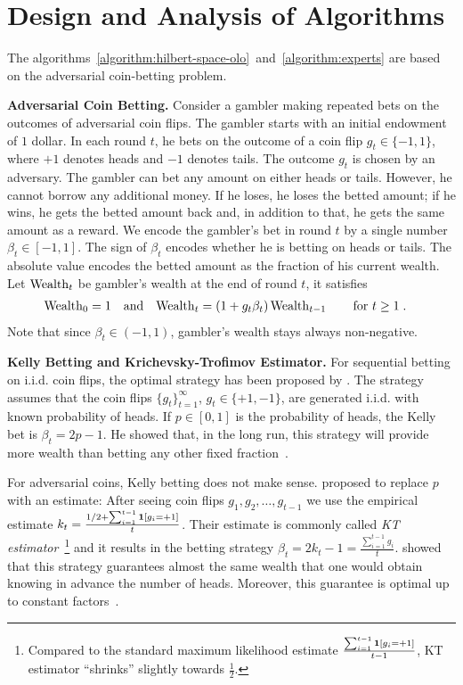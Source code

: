 \section{Design and Analysis of Algorithms}

The algorithms~\ref{algorithm:hilbert-space-olo}~and~\ref{algorithm:experts}
are based on the adversarial coin-betting problem.

\textbf{Adversarial Coin Betting.}
Consider a gambler making
repeated bets on the outcomes of adversarial coin flips. The gambler starts with an
initial endowment of $1$ dollar. In each round $t$, he bets on the outcome of a
coin flip $g_t \in \{-1,1\}$, where $+1$ denotes heads and $-1$ denotes tails.
The outcome $g_t$ is chosen by an adversary.
The gambler can bet any amount on either heads or tails. However, he cannot borrow
any additional money. If he loses, he loses the betted
amount; if he wins, he gets the betted amount back and, in addition to that, he
gets the same amount as a reward.  We encode the gambler's bet in round $t$ by a
single number $\beta_t \in [-1,1]$. The sign of $\beta_t$ encodes whether he is
betting on heads or tails. The absolute value encodes the betted amount as the
fraction of his current wealth.
Let $\operatorname{Wealth}_t$ be gambler's wealth at the end of round $t$, it satisfies
\begin{align}
\label{equation:wealth-recurrence}
\operatorname{Wealth}_0 & = 1 &
& \text{and} &
\operatorname{Wealth}_t & = (1 + g_t \beta_t) \operatorname{Wealth}_{t-1} \qquad \text{for $t \ge 1$} \; .
\end{align}
Note that since $\beta_t \in (-1,1)$, gambler's wealth stays always non-negative.

\textbf{Kelly Betting and Krichevsky-Trofimov Estimator.}
For sequential betting on i.i.d. coin flips, the optimal strategy has been proposed by \citet{Kelly-1956}.
The strategy assumes that the coin flips $\{g_t\}_{t=1}^\infty$, $g_t
\in \{+1,-1\}$, are generated i.i.d. with known probability of heads. If $p \in
[0,1]$ is the probability of heads, the Kelly bet is $\beta_t = 2p - 1$. He
showed that, in the long run, this strategy will provide more wealth than
betting any other fixed fraction~\cite{Kelly-1956}.

For adversarial coins, Kelly betting does not make sense.
\citet{Krichevsky-Trofimov-1981} proposed to replace $p$ with an estimate:
After seeing coin flips
$g_1, g_2, \dots, g_{t-1}$ we use the empirical estimate $k_t = \frac{1/2 +
\sum_{i=1}^{t-1} \mathbf{1}[g_i = +1]}{t}$. Their
estimate is commonly called \emph{KT estimator}~\footnote{Compared to the
standard maximum likelihood estimate $\frac{\sum_{i=1}^{t-1} \mathbf{1}[g_i =
+1]}{t-1}$, KT estimator ``shrinks'' slightly towards $\frac{1}{2}$.}
and it results in the betting strategy $\beta_t = 2k_t - 1 = \tfrac{\sum_{i=1}^{t-1} g_i}{t}$.
\citeauthor{Krichevsky-Trofimov-1981} showed that this strategy guarantees almost the same wealth that one would obtain knowing in advance the number of heads. Moreover, this guarantee is optimal up to constant
factors~\citep{Cesa-Bianchi-Lugosi-2006}.

